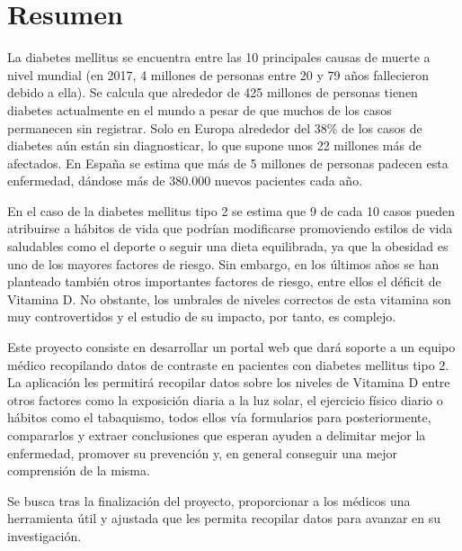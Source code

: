 \chapter*{Resumen}

   La diabetes mellitus se encuentra entre las 10 principales causas de muerte a nivel mundial (en 2017, 4 millones de personas entre 20 y 79 años fallecieron debido a ella). Se calcula que alrededor de 425 millones de personas tienen diabetes actualmente en el mundo a pesar de que muchos de los casos permanecen sin registrar. Solo en Europa alrededor del 38\% de los casos de diabetes aún están sin diagnosticar, lo que supone unos 22 millones más de afectados. En España se estima que más de 5 millones de personas padecen esta enfermedad, dándose más de 380.000 nuevos pacientes cada año.  \newline
   
	En el caso de la diabetes mellitus tipo 2 se estima que 9 de cada 10 casos pueden atribuirse a hábitos de vida que podrían modificarse promoviendo estilos de vida saludables como el deporte o seguir una dieta equilibrada, ya que la obesidad es uno de los mayores factores de riesgo. Sin embargo, en los últimos años se han planteado también otros importantes factores de riesgo, entre ellos el déficit de Vitamina D. No obstante, los umbrales de niveles correctos de esta vitamina son muy controvertidos y el estudio de su impacto, por tanto, es complejo. \newline

    Este proyecto consiste en desarrollar un portal web que dará soporte a un equipo médico recopilando datos de contraste en pacientes con diabetes mellitus tipo 2. La aplicación les permitirá recopilar datos sobre los niveles de Vitamina D entre otros factores como la exposición diaria a la luz solar, el ejercicio físico diario o hábitos como el tabaquismo, todos ellos vía formularios para posteriormente, compararlos y extraer conclusiones que esperan ayuden a delimitar mejor la enfermedad, promover su prevención y, en general conseguir una mejor comprensión de la misma. \newline

   Se busca tras la finalización del proyecto, proporcionar a los médicos una herramienta útil y ajustada que les permita recopilar datos para avanzar en su investigación.
